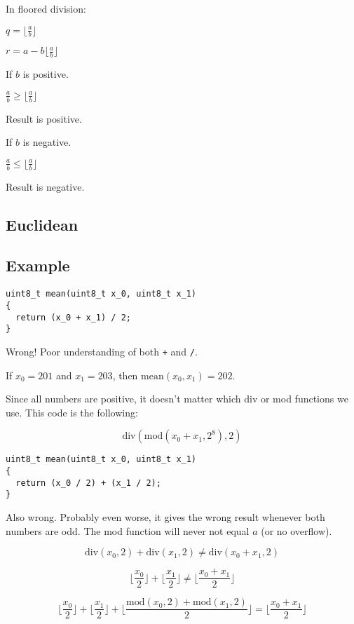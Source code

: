 In floored division:

$q = \lfloor \frac{a}{b} \rfloor$

$r = a - b \lfloor \frac{a}{b} \rfloor$

If $b$ is positive.

$\frac{a}{b} \geq \lfloor \frac{a}{b} \rfloor$

Result is positive.

If $b$ is negative.

$\frac{a}{b} \leq \lfloor \frac{a}{b} \rfloor$

Result is negative.

\subsection{Euclidean}

\subsection{Example}

\begin{lstlisting}
uint8_t mean(uint8_t x_0, uint8_t x_1)
{
  return (x_0 + x_1) / 2;
}
\end{lstlisting}

Wrong! Poor understanding of both \texttt{+} and \texttt{/}.

If $x_0 = 201$ and $x_1 = 203$, then $\text{mean}(x_0, x_1) = 202$.

Since all numbers are positive, it doesn't matter which div or mod functions we
use.
This code is the following:

\begin{equation*}
  \text{div}(\text{mod}(x_0 + x_1, 2^{8}), 2)
\end{equation*}

\begin{lstlisting}
uint8_t mean(uint8_t x_0, uint8_t x_1)
{
  return (x_0 / 2) + (x_1 / 2);
}
\end{lstlisting}

Also wrong. Probably even worse, it gives the wrong result whenever both numbers
are odd. The mod function will never not equal $a$ (or no overflow).

\begin{equation*}
  \text{div}(x_0 , 2) + \text{div}(x_1 , 2) \neq \text{div}(x_0 + x_1, 2)
\end{equation*}

\begin{equation*}
  \lfloor \frac{x_0}{2} \rfloor + \lfloor \frac{x_1}{2} \rfloor
  \neq \lfloor \frac{x_0 + x_1}{2} \rfloor
\end{equation*}

\begin{equation*}
  \lfloor \frac{x_0}{2} \rfloor + \lfloor \frac{x_1}{2} \rfloor
  + \lfloor \frac{\text{mod}(x_0, 2) + \text{mod}(x_1, 2)}{2} \rfloor
  = \lfloor \frac{x_0 + x_1}{2} \rfloor
\end{equation*}
